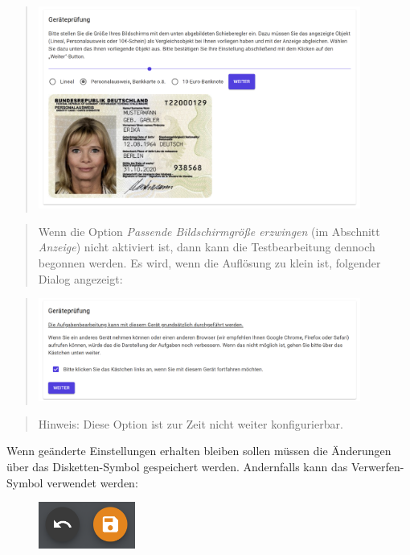 \documentclass[
  letterpaper,
  DIV=11]{scrreprt}
\begin{document}
\begin{tcolorbox}
\begin{quote}
\includegraphics[width=4.16667in,height=\textheight]{img/screenshot-check-display-size-01-DEU.png}
\end{quote}

\begin{quote}
Wenn die Option \emph{Passende Bildschirmgröße erzwingen} (im Abschnitt
\emph{Anzeige}) nicht aktiviert ist, dann kann die Testbearbeitung
dennoch begonnen werden. Es wird, wenn die Auflösung zu klein ist,
folgender Dialog angezeigt:
\end{quote}

\begin{quote}
\includegraphics[width=4.16667in,height=\textheight]{img/screenshot-check-display-size-02-DEU.png}
\end{quote}

\begin{quote}
Hinweis: Diese Option ist zur Zeit nicht weiter konfigurierbar.
\end{quote}

Wenn geänderte Einstellungen erhalten bleiben sollen müssen die
Änderungen über das Disketten-Symbol gespeichert werden. Andernfalls
kann das Verwerfen-Symbol verwendet werden:

\begin{figure}[H]

\includegraphics[width=1.25in,height=\textheight]{img/screenshot-icons-undo-and-save-01.png} \hfill{}

\end{figure}

\end{tcolorbox}
\end{document}
